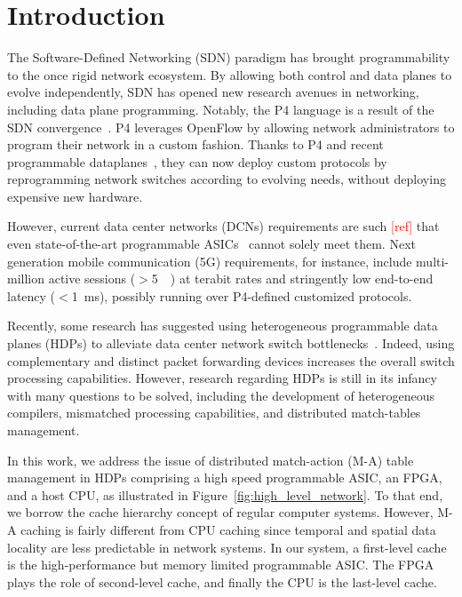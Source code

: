 \section{Introduction}\label{sec:intro}

The Software-Defined Networking (SDN) paradigm has brought programmability to the once rigid network ecosystem.
By allowing both control and data planes to evolve independently, SDN has opened new research avenues in networking, including data plane programming.
Notably, the P4 language is a result of the SDN convergence~\cite{Bosshart:14}.
P4 leverages OpenFlow by allowing network administrators to program their network in a custom fashion.
Thanks to P4 and recent programmable dataplanes~\cite{Bosshart:13}, they can now deploy custom protocols by reprogramming network switches according to evolving needs, without deploying expensive new hardware. 

However, current data center networks (DCNs) requirements are such \textcolor{red}{[ref]} that even state-of-the-art programmable ASICs~\cite{tofino:18} cannot solely meet them.
Next generation mobile communication (5G) requirements, for instance, include multi-million active sessions ($>$\SI{5}{\mega\nothing}) at terabit rates and stringently low end-to-end latency ($<$\SI{1}{\milli\second}), possibly running over P4-defined customized protocols.

Recently, some research has suggested using heterogeneous programmable data planes (HDPs) to alleviate data center network switch bottlenecks~\cite{p4eu:18}.
Indeed, using complementary and distinct packet forwarding devices increases the overall switch processing capabilities.
However, research regarding HDPs is still in its infancy with many questions to be solved, including the development of heterogeneous compilers, mismatched processing capabilities, and distributed match-tables management.

In this work, we address the issue of distributed match-action (M-A) table management in HDPs comprising a high speed programmable ASIC, an FPGA, and a host CPU, as illustrated in Figure~\ref{fig:high_level_network}.
To that end, we borrow the cache hierarchy concept of regular computer systems.
However, M-A caching is fairly different from CPU caching since temporal and spatial data locality are less predictable in network systems. 
In our system, a first-level cache is the high-performance but memory limited programmable ASIC.
The FPGA plays the role of second-level cache, and finally the CPU is the last-level cache.

